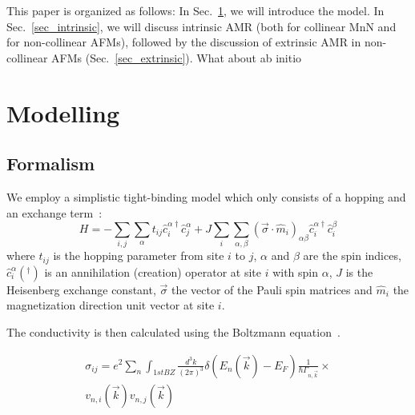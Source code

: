 \documentclass[prb,showpacs,amsmath,amssymb,superscriptaddress,twocolumn,floatfix]{revtex4-1}
\begin{document}
This paper is organized as follows: In Sec.~\ref{sec_modelling}, we
will introduce the model. In Sec.~\ref{sec_intrinsic}, we will discuss
intrinsic AMR (both for collinear MnN and for non-collinear AFMs),
followed by the discussion of extrinsic AMR in non-collinear AFMs (Sec.~\ref{sec_extrinsic}). {\color{red} What about ab initio}


\section{Modelling}
\label{sec_modelling}

\subsection{Formalism}

We employ a simplistic tight-binding model which only consists of a hopping and an exchange term~\cite{Gonzalez-Hernandez:2024}:
\begin{equation}
H = -\sum_{i, j}\sum_\alpha t_{ij} {\hat{c}_i^{\alpha\dagger}} \hat{c}^\alpha_j + J \sum_{i} \sum_{\alpha, \beta} (\vec{\sigma} \cdot \hat{m}_i)_{\alpha \beta} {\hat{c}_i^{\alpha\dagger}} \hat{c}^\beta_i 
	\label{eq_sdmodel}
\end{equation} 
where $t_{ij}$ is the hopping parameter from site $i$ to $j$, $\alpha$ and $\beta$ are the spin indices, ${\hat{c}_i^{\alpha}}(^\dagger)$ is an annihilation (creation) operator at site $i$ with spin $\alpha$, $J$ is the Heisenberg exchange constant, $\vec{\sigma}$ the vector of the Pauli spin matrices and $\hat{m}_i$ the magnetization direction unit vector at site $i$.

The conductivity is then calculated using the Boltzmann equation~\cite{Vyborny:2009}. 

\begin{multline}
	\sigma_{ij} = e^2 \sum_n  \int_ {1st BZ} \frac{d^3k}{(2\pi)^3} \delta(E_n(\vec{k}) - E_F) \frac{1}{\hbar \Gamma_{n, \vec{k}}} \times \\ v_{n,i}(\vec{k}) v_{n,j}(\vec{k})
	\label{eq_Boltzmann_1}
\end{multline}
\end{document}
